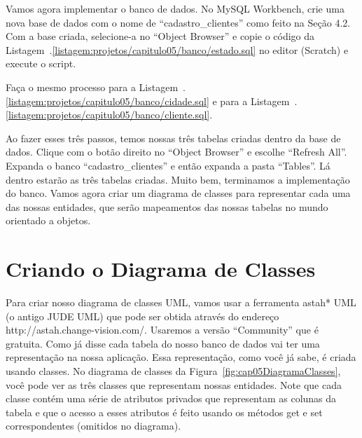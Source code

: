 Vamos agora implementar o banco de dados. No MySQL Workbench, crie uma nova base de dados com o nome de ``cadastro\_clientes'' como feito na Seção 4.2. Com a base criada, selecione-a no ``Object Browser'' e copie o código da Listagem~\thechapter.\ref{listagem:projetos/capitulo05/banco/estado.sql} no editor (Scratch) e execute o script.


Faça o mesmo processo para a Listagem~\thechapter.\ref{listagem:projetos/capitulo05/banco/cidade.sql} e para a Listagem~\thechapter.\ref{listagem:projetos/capitulo05/banco/cliente.sql}.



Ao fazer esses três passos, temos nossas três tabelas criadas dentro da base de dados. Clique com o botão direito no ``Object Browser'' e escolhe ``Refresh All''. Expanda o banco ``cadastro\_clientes'' e então expanda a pasta ``Tables''. Lá dentro estarão as três tabelas criadas. Muito bem, terminamos a implementação do banco. Vamos agora criar um diagrama de classes para representar cada uma das nossas entidades, que serão mapeamentos das nossas tabelas no mundo orientado a objetos.



\section{Criando o Diagrama de Classes}

Para criar nosso diagrama de classes UML, vamos usar a ferramenta astah* UML (o antigo JUDE UML) que pode ser obtida através do endereço http://astah.change-vision.com/. Usaremos a versão ``Community'' que é gratuita. Como já disse cada tabela do nosso banco de dados vai ter uma representação na nossa aplicação. Essa representação, como você já sabe, é criada usando classes. No diagrama de classes da Figura~\ref{fig:cap05DiagramaClasses}, você pode ver as três classes que representam nossas entidades. Note que cada classe contém uma série de atributos privados que representam as colunas da tabela e que o acesso a esses atributos é feito usando os métodos get e set correspondentes (omitidos no diagrama). 


